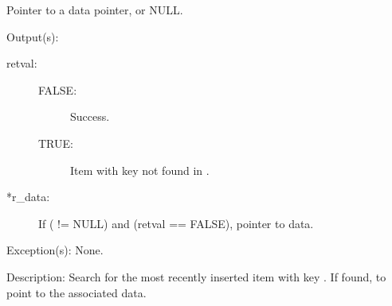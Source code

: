 \begin{capi}
\begin{capilist}
\begin{description}
			Pointer to a data pointer, or NULL.
		\end{description}
	\item[Output(s): ]
		\begin{description}\item[]
		\item[retval: ]
			\begin{description}\item[]
			\item[FALSE: ]
				Success.
			\item[TRUE: ]
				Item with key  not found in
				.
			\end{description}
		\item[*r\_data: ]
			If ( != NULL) and (retval == FALSE),
			pointer to data.
		\end{description}
	\item[Exception(s): ] None.
	\item[Description: ]
		Search for the most recently inserted item with key
		.  If found,  to point to the
		associated data.
	\end{capilist}
\end{capi}
